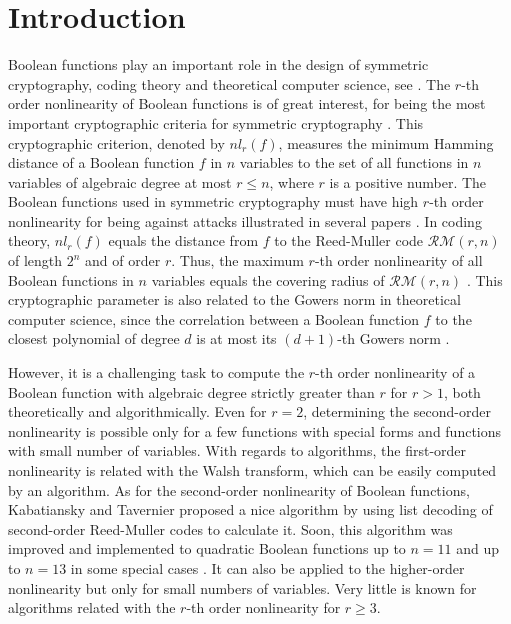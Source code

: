 \documentclass{article}
\newcommand{\0}{\textbf{0}}
\newcommand{\1}{\textbf{1}}
\theoremstyle{plain}
\begin{document}
\section{Introduction}
    Boolean functions play an important role in the design of symmetric cryptography, coding theory and theoretical computer science, see \cite{Carlet2020book,BhattacharyyaKSSZ2010gowers,CohenHLL1997RMcodecover}.
    The $r$-th order nonlinearity of Boolean functions is of great interest, for being the most important cryptographic criteria for symmetric cryptography \cite{Carlet2020book}.
    This cryptographic criterion, denoted by $nl_r(f)$, measures the minimum Hamming distance of a Boolean function $f$ in $n$ variables to the set of all functions in $n$ variables of algebraic degree at most $r\le n$, where $r$ is a positive number.
    The Boolean functions used in symmetric cryptography must have high $r$-th order nonlinearity for being against attacks illustrated in several papers \cite{Golic1996lower_order_approximation,IwataK1999highorderbentfunction,KnudsenR1996nonlinear_approximation,Courtois2002XL_algorithm_and_NL_r}.
    In coding theory, $nl_r(f)$ equals the distance from $f$ to the Reed-Muller code $\mathcal{RM}(r,n)$ of length $2^n$ and of order $r$.
    Thus, the maximum $r$-th order nonlinearity of all Boolean functions in $n$ variables equals the covering radius of $\mathcal{RM}(r,n)$ \cite{CohenHLL1997RMcodecover}.
    This cryptographic parameter is also related to the Gowers norm in theoretical computer science, since the correlation between a Boolean function $f$ to the closest polynomial of degree $d$ is at most its $(d+1)$-th Gowers norm \cite{BhattacharyyaKSSZ2010gowers}.

    However, it is a challenging task to compute the $r$-th order nonlinearity of a Boolean function with algebraic degree strictly greater than $r$ for $r>1$, both theoretically and algorithmically. 
    Even for $r=2$, determining the second-order nonlinearity is possible only for a few functions with special forms and functions with small number of variables. 
    With regards to algorithms, the first-order nonlinearity is related with the Walsh transform, which can be easily computed by an algorithm.
    As for the second-order nonlinearity of Boolean functions, Kabatiansky and Tavernier \cite{KabatianskyT2005listdecoding_RM_2_n} proposed a nice algorithm by using list decoding of second-order Reed-Muller codes to calculate it.
    Soon, this algorithm was improved and implemented to quadratic Boolean functions up to $n=11$ and up to $n=13$ in some special cases \cite{FourquetT2008improved_listdecoding_RM_2_n}.
    It can also be applied to the higher-order nonlinearity but only for small numbers of variables.
    Very little is known for algorithms related with the $r$-th order nonlinearity for $r\ge 3$.
\end{document}
